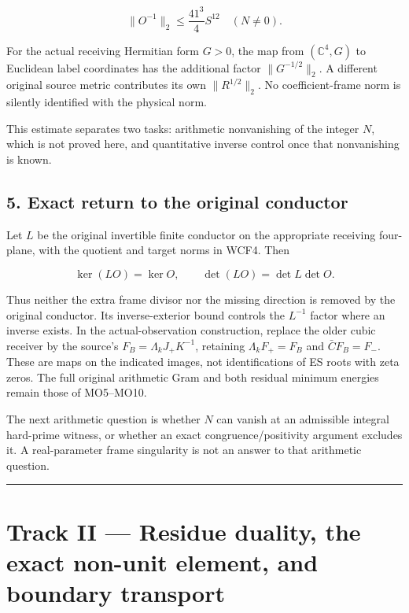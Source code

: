 \[
 \boxed{\|O^{-1}\|_2\le\frac{41^3}{4}S^{12}\quad(N\ne0).}
\]

For the actual receiving Hermitian form \(G>0\), the map from
\((\mathbb C^4,G)\) to Euclidean label coordinates has the additional
factor \(\|G^{-1/2}\|_2\). A different original source metric
contributes its own \(\|R^{1/2}\|_2\). No coefficient-frame norm is
silently identified with the physical norm.

This estimate separates two tasks: arithmetic nonvanishing of the
integer \(N\), which is not proved here, and quantitative inverse
control once that nonvanishing is known.

\subsection{5. Exact return to the original
conductor}\label{exact-return-to-the-original-conductor}

Let \(L\) be the original invertible finite conductor on the appropriate
receiving four-plane, with the quotient and target norms in WCF4. Then

\[
 \ker(LO)=\ker O,\qquad \det(LO)=\det L\det O.
\]

Thus neither the extra frame divisor nor the missing direction is
removed by the original conductor. Its inverse-exterior bound controls
the \(L^{-1}\) factor where an inverse exists. In the actual-observation
construction, replace the older cubic receiver by the source's
\(F_B=\Lambda_kJ_+K^{-1}\), retaining \(\Lambda_kF_+=F_B\) and
\(\bar C F_B=F_-\). These are maps on the indicated images, not
identifications of ES roots with zeta zeros. The full original
arithmetic Gram and both residual minimum energies remain those of
MO5--MO10.

The next arithmetic question is whether \(N\) can vanish at an
admissible integral hard-prime witness, or whether an exact
congruence/positivity argument excludes it. A real-parameter frame
singularity is not an answer to that arithmetic question.

\begin{center}\rule{0.5\linewidth}{0.5pt}\end{center}

\section{Track II --- Residue duality, the exact non-unit element, and
boundary
transport}\label{track-ii-residue-duality-the-exact-non-unit-element-and-boundary-transport}

